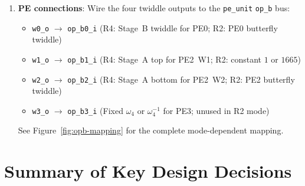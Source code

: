 \documentclass[11pt,a4paper]{article}
\newcommand{\sv}[1]{\texttt{#1}}
\newcommand{\port}[1]{\texttt{#1}}
\begin{document}
\begin{enumerate}[label=\textbf{\arabic*.}]
  \item \textbf{PE connections}: Wire the four twiddle outputs to the \sv{pe\_unit} \port{op\_b} bus:
    \begin{itemize}
      \item \port{w0\_o} $\to$ \port{op\_b0\_i} \;
            (R4: Stage~B twiddle for PE0; R2: PE0 butterfly twiddle)
      \item \port{w1\_o} $\to$ \port{op\_b1\_i} \;
            (R4: Stage~A top for PE2~W1; R2: constant $1$ or $1665$)
      \item \port{w2\_o} $\to$ \port{op\_b2\_i} \;
            (R4: Stage~A bottom for PE2~W2; R2: PE2 butterfly twiddle)
      \item \port{w3\_o} $\to$ \port{op\_b3\_i} \;
            (Fixed $\omega_4$ or $\omega_4^{-1}$ for PE3; unused in R2 mode)
    \end{itemize}
    See Figure~\ref{fig:opb-mapping} for the complete mode-dependent mapping.
\end{enumerate}

\section{Summary of Key Design Decisions}
\label{sec:design-decisions}
\end{document}
